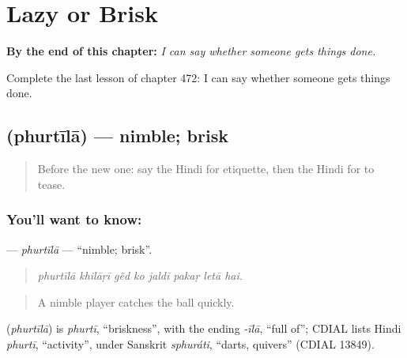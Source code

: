 
\chapter{Lazy or Brisk}
\label{ch:hi-lazy-or-brisk}

\begin{chapteropening}
\textbf{By the end of this chapter:} \emph{I can say whether someone gets things done.}

Complete the last lesson of chapter 472: I can say whether someone gets things done.
\end{chapteropening}

\section[\texorpdfstring{\hi{फुर्तीला} (phurtīlā)}{फुर्तीला (phurtīlā)}]{ (phurtīlā) — nimble; brisk}

\label{lesson:HI-C472-phurtila}



\begin{quote}
Before the new one: say the Hindi for etiquette, then the Hindi for to tease.
\end{quote}

\subsection*{You'll want to know: }
\textbf{} — \emph{phurtīlā} — \textquotedblleft{}nimble; brisk\textquotedblright{}.

\begin{quote}
       
\end{quote}

\begin{quote}
\emph{phurtīlā khilāṛī gẽd ko jaldī pakaṛ letā hai.}
\end{quote}

\begin{quote}
A nimble player catches the ball quickly.
\end{quote}

\begin{cousinweb}
\textbf{} (\emph{phurtīlā}) is \emph{phurtī}, \textquotedblleft{}briskness\textquotedblright{}, with the ending \emph{-īlā}, \textquotedblleft{}full of\textquotedblright{}; CDIAL lists Hindi \emph{phurtī}, \textquotedblleft{}activity\textquotedblright{}, under Sanskrit \emph{sphuráti}, \textquotedblleft{}darts, quivers\textquotedblright{} (CDIAL 13849).
\end{cousinweb}

